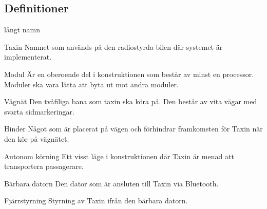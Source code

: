 \documentclass[kravspec/krav.tex]{subfiles}
\begin{document}
\subsection{Definitioner}
\begin{labeling}{långt namn}
    \item[Taxin] Namnet som används på den radiostyrda bilen där systemet är
    implementerat.
    \item[Modul] Är en oberoende del i konstruktionen som består av minst en
    processor. Moduler ska vara lätta att byta ut mot andra moduler.
    \item[Vägnät] Den tvåfiliga bana som taxin ska köra på. Den består av vita
    vägar med svarta sidmarkeringar.
    \item[Hinder] Något som är placerat på vägen och förhindrar framkomsten för
    Taxin när den kör på vägnätet.
    \item[Autonom körning] Ett visst läge i konstruktionen där Taxin är menad
    att transportera passagerare.
    \item[Bärbara datorn] Den dator som är ansluten till Taxin via Bluetooth.
    \item[Fjärrstyrning] Styrning av Taxin ifrån den bärbara datorn. 
\end{labeling}
\end{document}
